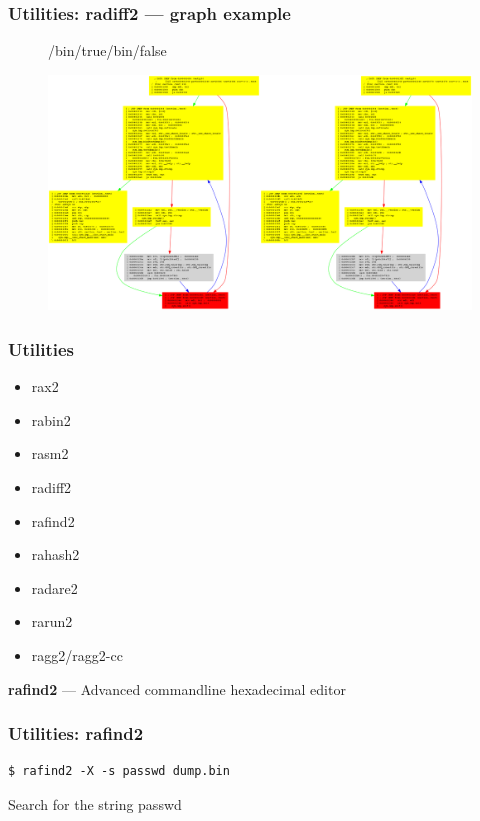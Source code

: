 \documentclass[10pt, compress]{beamer}
\begin{document}
\begin{frame}[fragile]
\frametitle{Utilities: radiff2 — graph example}
  \begin{figure}
\begin{center}/bin/true\hfill /bin/false\end{center}
  \includegraphics[width=\textwidth]{radiff2.png}
  \end{figure}
\end{frame}

\begin{frame}[fragile]
  \frametitle{Utilities}
     \begin{itemize}
        \item rax2
        \item rabin2
        \item rasm2
        \item radiff2
        \item \alert{rafind2}
        \item rahash2
        \item radare2
        \item rarun2
        \item ragg2/ragg2-cc
      \end{itemize}
\end{frame}

\begin{frame}[fragile]
  \center\textbf{rafind2} — Advanced commandline hexadecimal editor
  \noindent\makebox[\linewidth]{\rule{\paperwidth}{0.4pt}}
  \frametitle{Utilities: rafind2}
  \begin{verbatim}$ rafind2 -X -s passwd dump.bin\end{verbatim}
  \alert{Search for the string passwd}

\end{frame}
\end{document}

